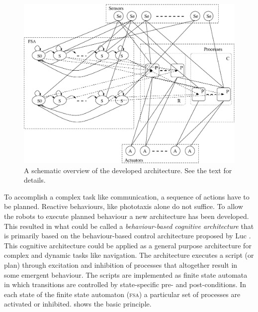 
\begin{figure}[t]
\centerline{\includegraphics[width=12cm]{lang_games//fsa.eps}}
\caption{A schematic overview of the developed architecture. See the text for details.}
\label{f:architscheme}
\end{figure}

To accomplish a complex task like communication, a sequence of actions have to be planned. Reactive behaviours, like phototaxis alone do not suffice. To allow the robots to execute planned behaviour a new architecture has been developed. This resulted in what could be called a {\em behaviour-based cognitive architecture} that is primarily based on the behaviour-based control architecture proposed by Luc \citet{steels:1994b}. This cognitive architecture could be applied as a general purpose architecture for complex and dynamic tasks like navigation. The architecture executes a script (or plan) through excitation and inhibition of processes that altogether result in some emergent behaviour. The scripts are implemented as finite state automata in which transitions are controlled by state-specific pre- and post-conditions. In each state of the finite state automaton (\textsc{fsa}) a particular set of processes are activated or inhibited.  shows the basic principle.

